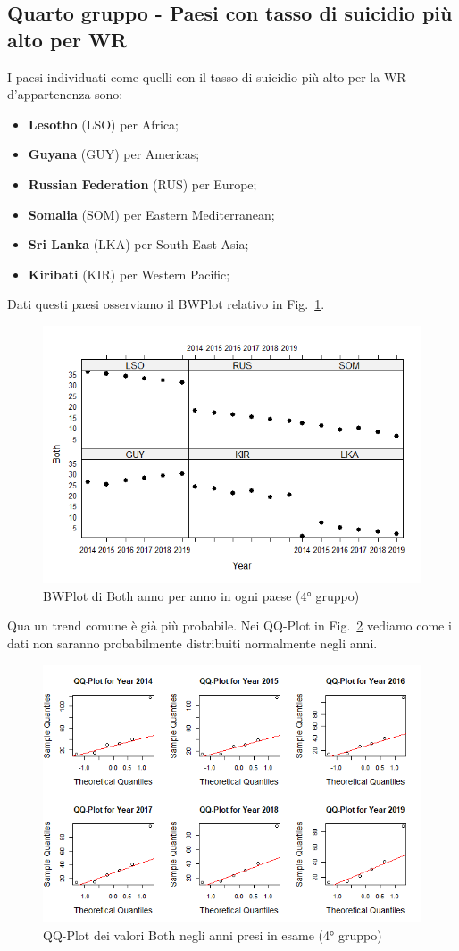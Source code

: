 \documentclass[conference]{IEEEtran}
\begin{document}
\subsection{Quarto gruppo - Paesi con tasso di suicidio più alto per WR}

I paesi individuati come quelli con il tasso di suicidio più alto per la
WR d'appartenenza sono:
\begin{itemize}
    \item \textbf{Lesotho} (LSO) per Africa;
    \item \textbf{Guyana} (GUY) per Americas;
    \item \textbf{Russian Federation} (RUS) per Europe;
    \item \textbf{Somalia} (SOM) per Eastern Mediterranean;
    \item \textbf{Sri Lanka} (LKA) per South-East Asia;
    \item \textbf{Kiribati} (KIR) per Western Pacific; 
\end{itemize}
Dati questi paesi osserviamo il BWPlot relativo in Fig.~\ref{11fourthgroup}.
\begin{figure}[htbp]
    \centerline{\includegraphics[width=.5\textwidth]{img/11 - Fourthgroup.png}}
    \caption{BWPlot di Both anno per anno in ogni paese (4° gruppo)}
    \label{11fourthgroup}
\end{figure}
Qua un trend comune è già più probabile.
Nei QQ-Plot in Fig.~\ref{12fourthqq} vediamo come i dati non saranno
probabilmente distribuiti normalmente negli anni.
\begin{figure}[htbp]
    \centerline{\includegraphics[width=.5\textwidth]{img/12 - Fourthqq.png}}
    \caption{QQ-Plot dei valori Both negli anni presi in esame (4° gruppo)}
    \label{12fourthqq}
\end{figure}
\end{document}
